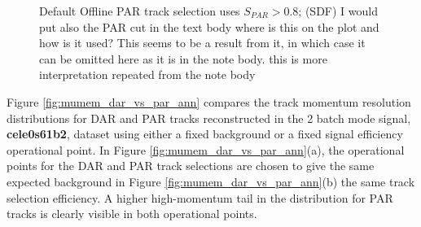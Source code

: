 \begin{figure}[H]
{  {\blue Default Offline} PAR track selection {\blue uses} $S_{PAR} > 0.8$; {\blue (SDF) I would put also the PAR cut in the text body}  
  {\blue where is this on the plot and how is it used? This seems to be a result from it, in which case it can be omitted here as it is in the note body.}
   {\blue this is more interpretation repeated from the note body}
}
\end{figure}

Figure \ref{fig:mumem_dar_vs_par_ann} compares the track momentum resolution distributions 
for DAR and PAR tracks reconstructed in {\blue the 2 batch mode signal, }{\bf cele0s61b2}{\blue ,} dataset
 {\blue using either a fixed background
or a fixed signal efficiency operational point.}
In Figure \ref{fig:mumem_dar_vs_par_ann}(a){\blue ,} the operational points for {\blue the} DAR and PAR track selection{\blue s}
are chosen to give the same expected background\strike{,}{\blue -} in Figure \ref{fig:mumem_dar_vs_par_ann}(b) \strike{-}{\blue ,}
the same track selection efficiency. {\blue A h}igher high-momentum tail in the distribution for PAR
tracks is clearly visible {\blue in both operational points}.

